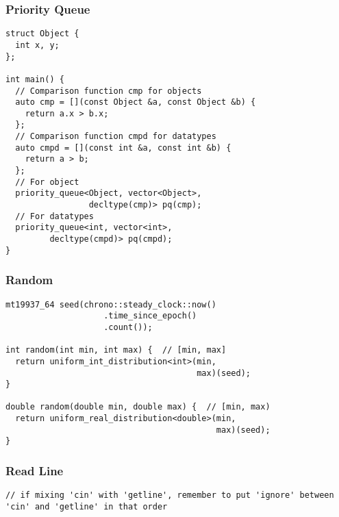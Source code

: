 \documentclass[twoside]{article}
\begin{document}
\begin{multicols*}{2}
{\subsubsection*{Priority Queue}
}
\begin{verbatim}
struct Object {
  int x, y;
};

int main() {
  // Comparison function cmp for objects
  auto cmp = [](const Object &a, const Object &b) {
    return a.x > b.x;
  };
  // Comparison function cmpd for datatypes
  auto cmpd = [](const int &a, const int &b) {
    return a > b;
  };
  // For object
  priority_queue<Object, vector<Object>,
                 decltype(cmp)> pq(cmp);
  // For datatypes
  priority_queue<int, vector<int>,
		 decltype(cmpd)> pq(cmpd);
}
\end{verbatim}

{
\subsubsection*{Random}
}
\begin{verbatim}
mt19937_64 seed(chrono::steady_clock::now()
                    .time_since_epoch()
                    .count());

int random(int min, int max) {  // [min, max]
  return uniform_int_distribution<int>(min,
                                       max)(seed);
}

double random(double min, double max) {  // [min, max)
  return uniform_real_distribution<double>(min,
                                           max)(seed);
}
\end{verbatim}

{
\subsubsection*{Read Line}
}
\begin{verbatim}
// if mixing 'cin' with 'getline', remember to put 'ignore' between 'cin' and 'getline' in that order


\end{verbatim}
\end{multicols*}
\end{document}
